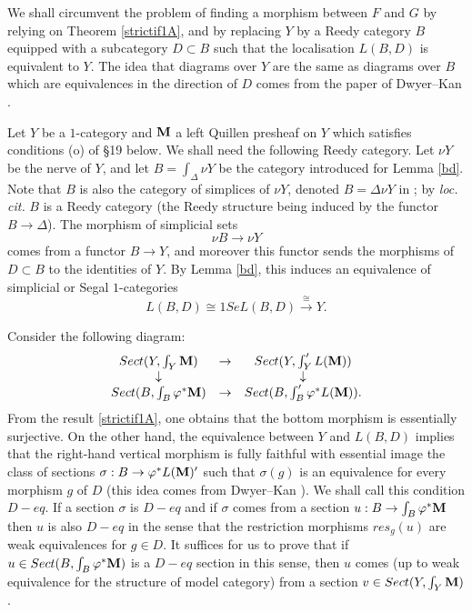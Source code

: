 We shall circumvent the problem of finding a morphism between $F$ and $G$
by relying on Theorem \ref{strictif1A},
and by replacing $Y$ by a
Reedy category $B$ equipped with a subcategory $D\subset B$ such that
the localisation $L(B,D)$ is equivalent to $Y$. The idea that diagrams
over $Y$ are the same as diagrams over $B$ which are equivalences
in the direction of $D$ comes from the paper of Dwyer--Kan
\cite{DwyerKanDiags}.



Let $Y$ be a $1$-category and ${\bf M}$ a left Quillen presheaf
on
$Y$ which satisfies conditions (o) of \S 19 below. We shall need the
following Reedy category. Let $\nu Y$ be the nerve of $Y$, and let
$B=\int _{\Delta} \nu Y$ be the category introduced for Lemma \ref{bd}.
Note that $B$ is also the category of simplices of $\nu Y$, denoted
$B=\Delta \nu Y$ in \cite{Hirschhorn} \cite{DHK}; by {\em loc. cit.}
$B$ is a Reedy category (the Reedy structure being induced by the
functor $B\rightarrow \Delta$). The morphism of simplicial sets
$$
\nu B\rightarrow \nu Y
$$
comes from a functor $B\rightarrow Y$, and moreover this functor sends
the morphisms of $D\subset B$ to the identities of $Y$. By Lemma
\ref{bd}, this induces an equivalence of simplicial or Segal
$1$-categories
$$
L(B,D)\cong 1SeL(B,D) \stackrel{\cong}{\rightarrow} Y.
$$

Consider the following diagram:
$$
\begin{array}{ccc}
Sect (Y, \int _Y{\bf M} ) & \rightarrow & Sect (Y, \int '_YL({\bf M} ))\\
\downarrow && \downarrow \\
Sect (B, \int _B \varphi ^{\ast} {\bf M} )&\rightarrow & Sect (B, \int '_B \varphi
^{\ast}L({\bf M} )).
\end{array}
$$
From the result \ref{strictif1A}, one obtains that the bottom morphism
is essentially surjective. On the other hand, the equivalence between $Y$
and $L(B,D)$ implies that the right-hand vertical morphism is fully
faithful with essential image the class
of sections $\sigma : B\rightarrow \varphi ^{\ast}L({\bf M} )'$ such that
$\sigma (g)$
is an equivalence for every morphism $g$ of $D$
(this idea comes from Dwyer--Kan \cite{DwyerKanDiags}). We shall call this
condition $D-eq$. If a section $\sigma $ is $D-eq$ and if $\sigma$ comes
from a section $u: B\rightarrow \int _B\varphi ^{\ast}{\bf M}$ then $u$ is also
$D-eq$ in the sense that the restriction morphisms $res_g(u)$ are weak
equivalences
for $g\in D$. It suffices for us to prove that if
$u\in Sect (B, \int _B\varphi ^{\ast} {\bf M} )$ is a $D-eq$ section in this
sense, then $u$ comes (up to weak equivalence for the structure of
model category) from a section $v\in Sect (Y, \int _Y{\bf M} )$.

